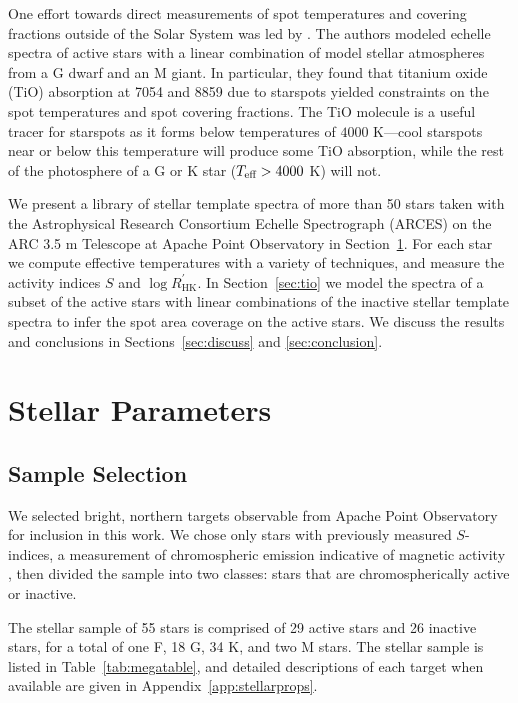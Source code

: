 One effort towards direct measurements of spot temperatures and covering fractions outside of the Solar System was led by \citet{Neff1995} \citep[see also][]{oneal1996, oneal1998, ONeal2001, ONeal2004}. The authors modeled echelle spectra of active stars with a linear combination of model stellar atmospheres from a G dwarf and an M giant. In particular, they found that titanium oxide (TiO) absorption at 7054 and 8859 \angstrom due to starspots yielded constraints on the spot temperatures and spot covering fractions. The TiO molecule is a useful tracer for starspots as it forms below temperatures of $4000$ K---cool starspots near or below this temperature will produce some TiO absorption, while the rest of the photosphere of a G or K star ($T_{\mbox{\scriptsize eff}} > 4000$ K) will not.

We present a library of stellar template spectra of more than 50 stars taken with the Astrophysical Research Consortium Echelle Spectrograph (ARCES) on the ARC 3.5 m Telescope at Apache Point Observatory in Section~\ref{sec:obs}. For each star we compute effective temperatures with a variety of techniques, and measure the activity indices $S$ and $\log R^\prime_\mathrm{HK}$. In Section~\ref{sec:tio} we model the spectra of a subset of the active stars with linear combinations of the inactive stellar template spectra to infer the spot area coverage on the active stars. We discuss the results and conclusions in Sections~\ref{sec:discuss} and \ref{sec:conclusion}.


\section{Stellar Parameters} \label{sec:obs}

\subsection{Sample Selection}

We selected bright, northern targets observable from Apache Point Observatory for inclusion in this work. We chose only stars with previously measured $S$-indices, a measurement of chromospheric emission indicative of magnetic activity  \citep{Wilson1968}, then divided the sample into two classes: stars that are chromospherically active or inactive. 

The stellar sample of 55 stars is comprised of 29 active stars and 26 inactive stars, for a total of one F, 18 G, 34 K, and two M stars. The stellar sample is listed in Table~\ref{tab:megatable}, and detailed descriptions of each target when available are given in Appendix~\ref{app:stellarprops}. 

